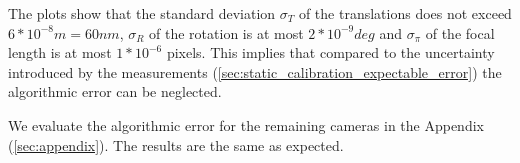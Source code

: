 The plots show that the standard deviation $\sigma_T$ of the translations does not exceed $6 * 10^{-8} m = 60 nm$, $\sigma_R$ of the rotation is at most $2 * 10^{-9} deg$ and $\sigma_{\pi}$ of the focal length is at most $1 * 10^{-6}$ pixels.
This implies that compared to the uncertainty introduced by the measurements (\autoref{sec:static_calibration_expectable_error}) the algorithmic error can be neglected.   

We evaluate the algorithmic error for the remaining cameras in the Appendix (\autoref{sec:appendix}). 
The results are the same as expected.

